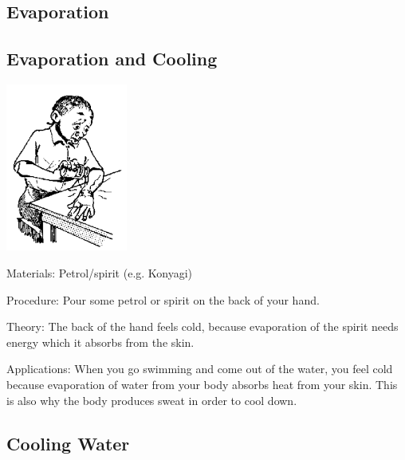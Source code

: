 \begin{multicols}{2}

\section*{Evaporation}


\subsection{Evaporation and Cooling}

\begin{center}
\includegraphics[width=0.3\textwidth]{./img/source/evap-cooling.png}
\end{center}

\begin{description*}
\item[Materials:]{Petrol/spirit (e.g. Konyagi)}
\item[Procedure:]{Pour some petrol or spirit on the back of your hand.}
\item[Theory:]{The back of the hand feels cold, because evaporation of the spirit needs energy which it absorbs from the skin.}
\item[Applications:]{When you go swimming and come out of the water, you feel cold because evaporation of water from your body absorbs heat from your skin. This is also why the body produces sweat in order to cool down.}
\end{description*}

\subsection{Cooling Water}


\end{multicols}
